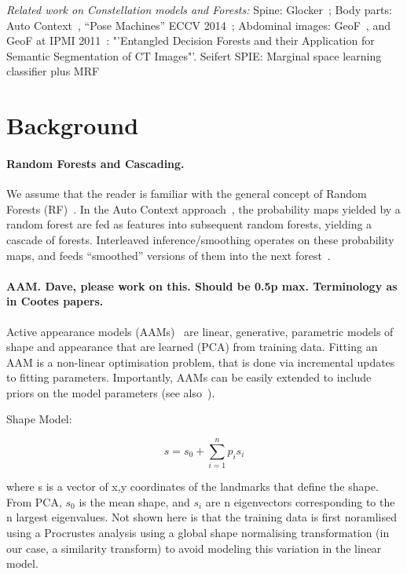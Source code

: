 \documentclass[10pt,twocolumn,letterpaper]{article}
\begin{document}
\emph{Related work on Constellation models and Forests: }
%
Spine: Glocker~\cite{Glocker2013}; 
%
Body parts: Auto Context~\cite{AutoContext2008}, "`Pose Machines"' ECCV 2014~\cite{PoseMachinesECCV2014}; 
% 
Abdominal images: GeoF~\cite{GeoForests2013}, and GeoF at IPMI 2011~\cite{CriminisiAbdominalIPMI2011}: "'Entangled Decision Forests and their Application for Semantic Segmentation of CT Images"'. Seifert SPIE: Marginal space learning classifier plus MRF~\cite{SeifertAnatomicalSPIE2009} 

\section{Background}

\paragraph{Random Forests and Cascading. }
We assume that the reader is familiar with the general concept of Random Forests (RF)~\cite{BreimanRF}. 
%
In the Auto Context approach~\cite{AutoContext2008}, the probability maps yielded by a random forest are fed as features into subsequent random forests, yielding a cascade of forests.  
%
Interleaved inference/smoothing operates on these probability maps, and feeds ``smoothed'' versions of them into the next forest~\cite{DTF,RTF,UweCVPR2013,GeoForests2013}. 
%



\paragraph{AAM. Dave, please work on this. Should be 0.5p max. Terminology as in Cootes papers.}
Active appearance models (AAMs)~\cite{CootesAAM2001} are linear, generative, parametric models of shape and appearance that are learned (PCA) from training data.  Fitting an AAM is a non-linear optimisation problem, that is done via incremental updates to fitting parameters.  Importantly, AAMs can be easily extended to include priors on the model parameters (see also~\cite{BakerAAM2004}).  

Shape Model:

\[s = s_0 + \sum_{i=1}^n p_i s_i\]

where s is a vector of x,y coordinates of the landmarks that define the shape.  From PCA, $s_0$ is the mean shape, and $s_i$ are n eigenvectors corresponding to the n largest eigenvalues.  Not shown here is that the training data is first noramlised using a Procrustes analysis using a global shape normalising transformation (in our case, a similarity transform) to avoid modeling this variation in the linear model.
\end{document}
